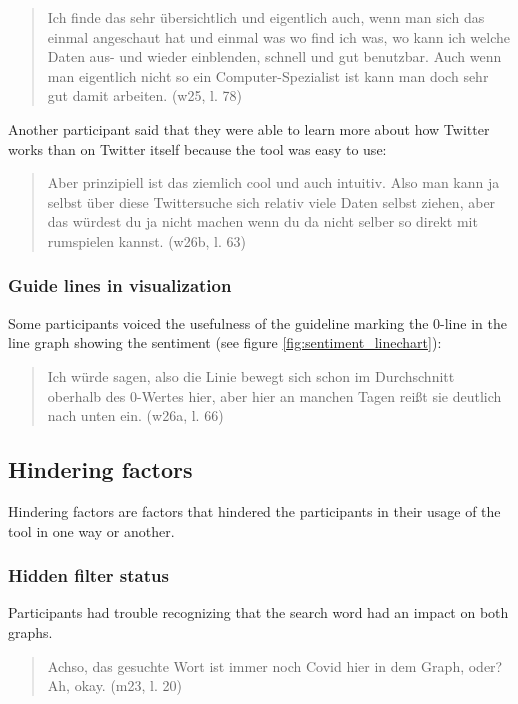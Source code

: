 \begin{quote}
    Ich finde das sehr übersichtlich und eigentlich auch, wenn man sich das einmal angeschaut hat und einmal was wo find ich was, wo kann ich welche Daten aus- und wieder einblenden, schnell und gut benutzbar. Auch wenn man eigentlich nicht so ein Computer-Spezialist ist kann man doch sehr gut damit arbeiten. (w25, l. 78)
\end{quote}

Another participant said that they were able to learn more about how Twitter works than on Twitter itself because the tool was easy to use:

\begin{quote}
    Aber prinzipiell ist das ziemlich cool und auch intuitiv. Also man kann ja selbst über diese Twittersuche sich relativ viele Daten selbst ziehen, aber das würdest du ja nicht machen wenn du da nicht selber so direkt mit rumspielen kannst. (w26b, l. 63)
\end{quote}

\subsubsection*{Guide lines in visualization}
Some participants voiced the usefulness of the guideline marking the 0-line in the line graph showing the sentiment (see figure \ref{fig:sentiment_linechart}):

\begin{quote}
    Ich würde sagen, also die Linie bewegt sich schon im Durchschnitt oberhalb des 0-Wertes hier, aber hier an manchen Tagen reißt sie deutlich nach unten ein. (w26a, l. 66)
\end{quote}

\clearpage
\subsection{Hindering factors}
Hindering factors are factors that hindered the participants in their usage of the tool in one way or another.

\subsubsection*{Hidden filter status}
Participants had trouble recognizing that the search word had an impact on both graphs.

\begin{quote}
    Achso, das gesuchte Wort ist immer noch Covid hier in dem Graph, oder? Ah, okay. (m23, l. 20)
\end{quote}

